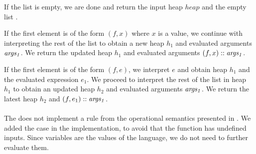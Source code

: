 If the list is empty, we are done and return the input heap $heap$
and the empty list \nil.

If the first element is of the form $(f, x)$ where $x$ is a value,
we continue with interpreting the rest of the list
to obtain a new heap $h_1$ and evaluated arguments $\mathit{args_1}$.
We return the updated heap $h_1$ and evaluated arguments $(f, x) :: \mathit{args_1}$.

If the first element is of the form $(f, e)$,
we interpret $e$ and obtain heap $h_1$ and the evaluated expression $e_1$.
We proceed to interpret the rest of the list in heap $h_1$
to obtain an updated heap $h_2$ and evaluated arguments $\mathit{args_1}$.
We return the latest heap $h_2$ and $(f, e_1) :: \mathit{args_1}$.\\
\\
The  does not implement
a rule from the operational semantics presented in .
We added the case in the implementation,
to avoid that the function has undefined inputs.
Since variables are the values of the language,
we do not need to further evaluate them.


